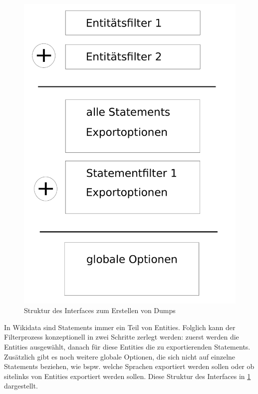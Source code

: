 \begin{figure}
  \includegraphics[width=\textwidth]{pics/ui-layout}
  \caption{Struktur des Interfaces zum Erstellen von Dumps}
  \label{fig:ui-layout}
\end{figure}

In Wikidata sind Statements immer ein Teil von Entities.
Folglich kann der Filterprozess konzeptionell in zwei Schritte zerlegt werden: zuerst werden die Entities ausgewählt, danach für diese Entities die zu exportierenden Statements.
Zusätzlich gibt es noch weitere globale Optionen, die sich nicht auf einzelne Statements beziehen, wie bspw. welche Sprachen exportiert werden sollen oder ob sitelinks von Entities exportiert werden sollen.
Diese Struktur des Interfaces in \cref{fig:ui-layout} dargestellt.

